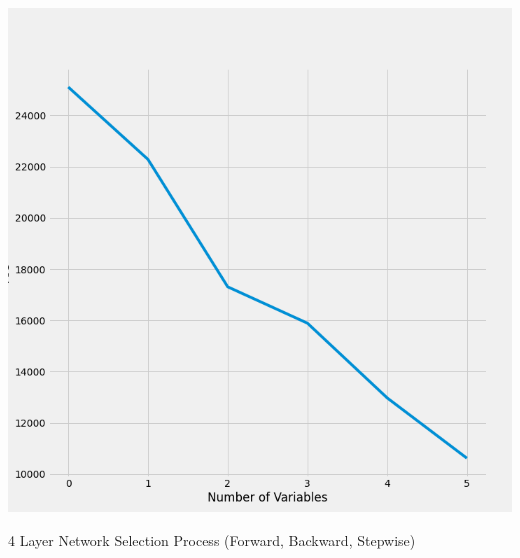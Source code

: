 \documentclass{article}
\begin{document}
	\includegraphics[scale = 0.2]{../plots/python/AICStepwise3L.png}
	
	4 Layer Network Selection Process (Forward, Backward, Stepwise)
	
\end{document}
